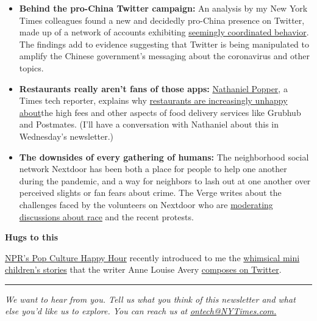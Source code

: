 \begin{itemize}
\item
  \textbf{Behind the pro-China Twitter campaign:} An analysis by my New
  York Times colleagues found a new and decidedly pro-China presence on
  Twitter, made up of a network of accounts exhibiting
  \href{https://www.nytimes3xbfgragh.onion/2020/06/08/technology/china-twitter-disinformation.html}{seemingly
  coordinated behavior}. The findings add to evidence suggesting that
  Twitter is being manipulated to amplify the Chinese government's
  messaging about the coronavirus and other topics.
\item
  \textbf{Restaurants really aren't fans of those apps:}
  \href{https://www.nytimes3xbfgragh.onion/by/nathaniel-popper}{Nathaniel
  Popper}, a Times tech reporter, explains why
  \href{https://www.nytimes3xbfgragh.onion/2020/06/09/technology/delivery-apps-restaurants-fees-virus.html}{restaurants
  are increasingly unhappy about}the high fees and other aspects of food
  delivery services like Grubhub and Postmates. (I'll have a
  conversation with Nathaniel about this in Wednesday's newsletter.)
\item
  \textbf{The downsides of every gathering of humans:} The neighborhood
  social network Nextdoor has been both a place for people to help one
  another during the pandemic, and a way for neighbors to lash out at
  one another over perceived slights or fan fears about crime. The Verge
  writes about the challenges faced by the volunteers on Nextdoor who
  are
  \href{https://www.theverge.com/21283993/nextdoor-app-racism-community-moderation-guidance-protests}{moderating
  discussions about race} and the recent protests.
\end{itemize}

\textbf{Hugs to this}

\href{https://www.npr.org/podcasts/510282/pop-culture-happy-hour}{NPR's
Pop Culture Happy Hour} recently introduced to me the
\href{https://twitter.com/AnneLouiseAvery/status/1267931929703317505?s=09}{whimsical
mini children's stories} that the writer Anne Louise Avery
\href{https://twitter.com/AnneLouiseAvery/status/1254385383510589441}{composes
on Twitter}.

\begin{center}\rule{0.5\linewidth}{\linethickness}\end{center}

\emph{We want to hear from you. Tell us what you think of this
newsletter and what else you'd like us to explore. You can reach us at}
\href{mailto:ontech@NYTimes.com?subject=On\%20Tech\%20Feedback}{\emph{ontech@NYTimes.com.}}


